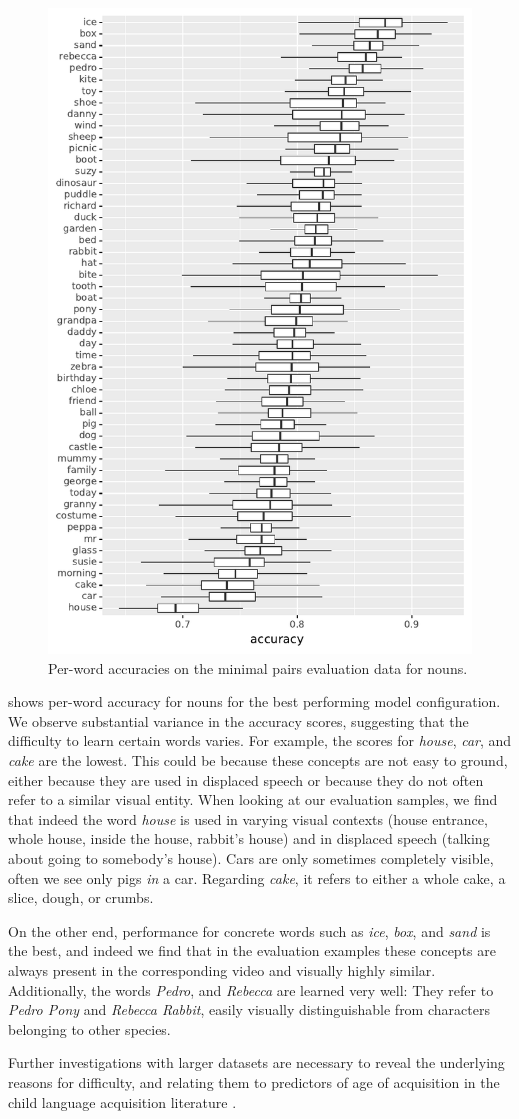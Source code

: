 \begin{figure}[htb]
  \centering
  \includegraphics[width=.5\textwidth]{results/targeted_triplets/acc_per_word_NOUN.pdf}
  \caption{Per-word accuracies on the minimal pairs evaluation data for nouns.}
  \label{fig:accuracy_targeted_triplets_nouns}
\end{figure}

 shows per-word
accuracy for nouns for the best performing model configuration.
We observe substantial variance in the accuracy scores, suggesting that the 
difficulty to learn certain words varies. For example, the 
scores for \textit{house}, \textit{car}, and \textit{cake} are the lowest. This could be 
because these concepts are not easy to ground, either because they are used in 
displaced speech or because they do not often refer to a similar visual entity. 
When looking at our evaluation samples, we find that indeed the word \textit{house} 
is used in varying visual contexts (house entrance, whole house, inside the
house, rabbit's house) and in displaced speech (talking about going 
to somebody's house). Cars are only sometimes completely visible, often we see 
only pigs \textit{in} a car. Regarding \textit{cake}, it refers to either a 
whole cake, a slice, dough, or crumbs.

On the other end, performance for concrete words such as \textit{ice}, 
\textit{box}, 
and \textit{sand} is the best, and indeed we find that in the evaluation examples 
these concepts are always present in the corresponding video and visually 
highly similar. Additionally, the words \textit{Pedro}, and \textit{Rebecca} 
are learned very well: They refer to \textit{Pedro Pony} and \textit{Rebecca Rabbit}, 
easily visually distinguishable from characters belonging to other species.

Further investigations with larger datasets are necessary to reveal the 
underlying reasons for difficulty, and relating them to predictors of age of 
acquisition in the child language acquisition literature 
\cite{roy2015predicting,frank2021variability}. 


